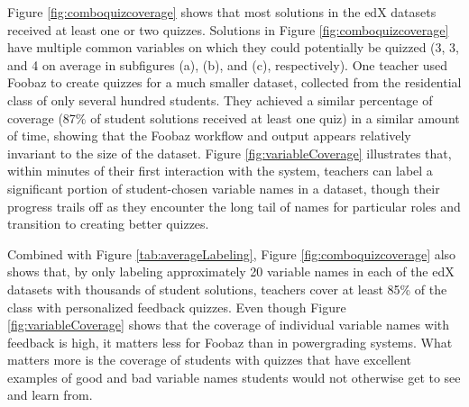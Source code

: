 {{Figure \ref{fig:comboquizcoverage} shows that most solutions in the edX datasets received at least one or two quizzes. Solutions in  Figure \ref{fig:comboquizcoverage} have multiple common variables on which they could potentially be quizzed (3, 3, and 4 on average in subfigures (a), (b), and (c), respectively). One teacher used Foobaz to create quizzes for a much smaller dataset, collected from the residential class of only several hundred students. They achieved a similar percentage of coverage (87\% of student solutions received at least one quiz) in a similar amount of time, showing that the Foobaz workflow and output appears relatively invariant to the size of the dataset. Figure \ref{fig:variableCoverage} illustrates that, within minutes of their first interaction with the system, teachers can label a significant portion of student-chosen variable names in a dataset, though their progress trails off as they encounter the long tail of names for particular roles and transition to creating better quizzes.

Combined with Figure \ref{tab:averageLabeling}, Figure \ref{fig:comboquizcoverage} also shows that, by only labeling approximately 20 variable names in each of the edX datasets with thousands of student solutions, teachers cover at least 85\% of the class with personalized feedback quizzes. Even though Figure \ref{fig:variableCoverage} shows that the coverage of individual variable names with feedback is high, it matters less for Foobaz than in powergrading systems. What matters more is the coverage of students with quizzes that have excellent examples of good and bad variable names students would not otherwise get to see and learn from.

}}
